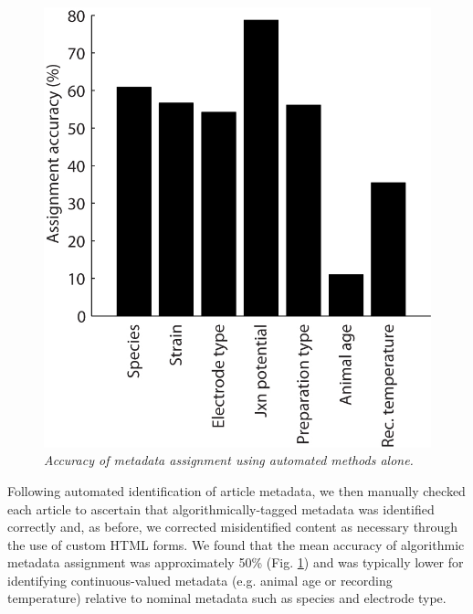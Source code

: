 \documentclass{template/frontiersSCNS} %
\begin{document}
\begin{figure}[htbp!]
\centering
\includegraphics[scale = 1]{figures/metadata_assignment_accuracy.jpg}
\caption{\textit{Accuracy of metadata assignment using automated methods alone.} }
\label{metadata_robot_accuracy_robot}
\end{figure}

Following automated identification of article metadata, we then manually checked each article to ascertain that algorithmically-tagged metadata was identified correctly and, as before, we corrected misidentified content as necessary through the use of custom HTML forms.  
We found that the mean accuracy of algorithmic metadata assignment was approximately 50\% (Fig. \ref{metadata_robot_accuracy_robot}) and was typically lower for identifying continuous-valued metadata (e.g. animal age or recording temperature) relative to nominal metadata such as species and electrode type.
\end{document}
